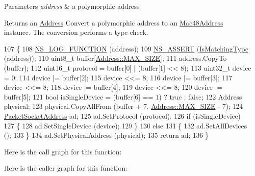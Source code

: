 \begin{DoxyParams}{Parameters}
{\em address} & a polymorphic address \\
\hline
\end{DoxyParams}
\begin{DoxyReturn}{Returns}
an \hyperlink{classns3_1_1Address}{Address} Convert a polymorphic address to an \hyperlink{classns3_1_1Mac48Address}{Mac48\+Address} instance. The conversion performs a type check. 
\end{DoxyReturn}

\begin{DoxyCode}
107 \{
108   \hyperlink{log-macros-disabled_8h_a90b90d5bad1f39cb1b64923ea94c0761}{NS\_LOG\_FUNCTION} (address);
109   \hyperlink{assert_8h_a6dccdb0de9b252f60088ce281c49d052}{NS\_ASSERT} (\hyperlink{classns3_1_1PacketSocketAddress_a9426c99ec2c26c22d3920ca5c63ae1cd}{IsMatchingType} (address));
110   uint8\_t buffer[\hyperlink{classns3_1_1Address_a34cb50781c65195ba10651d82d084b4fae450cf1a7cb3df8a05d29b23aecf7f84}{Address::MAX\_SIZE}];
111   address.CopyTo (buffer);
112   uint16\_t protocol = buffer[0] | (buffer[1] << 8);
113   uint32\_t device = 0;
114   device |= buffer[2];
115   device <<= 8;
116   device |= buffer[3];
117   device <<= 8;
118   device |= buffer[4];
119   device <<= 8;
120   device |= buffer[5];
121   \textcolor{keywordtype}{bool} isSingleDevice = (buffer[6] == 1) ? \textcolor{keyword}{true} : \textcolor{keyword}{false};
122   Address physical;
123   physical.CopyAllFrom (buffer + 7, \hyperlink{classns3_1_1Address_a34cb50781c65195ba10651d82d084b4fae450cf1a7cb3df8a05d29b23aecf7f84}{Address::MAX\_SIZE} - 7);
124   \hyperlink{classns3_1_1PacketSocketAddress_a1ef0ff511c019ff53496019aa8ec9c6a}{PacketSocketAddress} ad;
125   ad.SetProtocol (protocol);
126   \textcolor{keywordflow}{if} (isSingleDevice)
127     \{
128       ad.SetSingleDevice (device);
129     \}
130   \textcolor{keywordflow}{else}
131     \{
132       ad.SetAllDevices ();
133     \}
134   ad.SetPhysicalAddress (physical);
135   \textcolor{keywordflow}{return} ad;
136 \}
\end{DoxyCode}


Here is the call graph for this function\+:




Here is the caller graph for this function\+:


